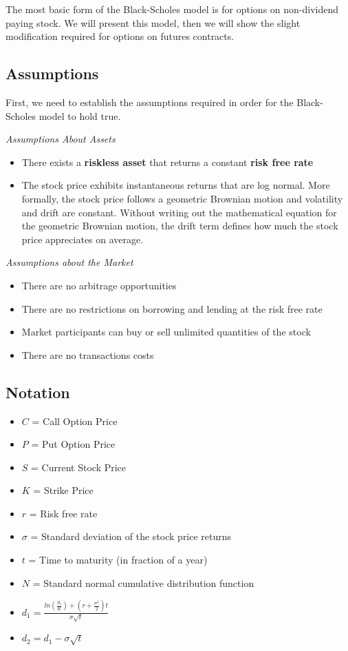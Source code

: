 \documentclass[
]{book}
\begin{document}
The most basic form of the Black-Scholes model is for options on non-dividend paying stock. We will present this model, then we will show the slight modification required for options on futures contracts.

\hypertarget{assumptions}{%
\subsection{Assumptions}\label{assumptions}}

First, we need to establish the assumptions required in order for the Black-Scholes model to hold true. \citep{blacksc2020}

\emph{Assumptions About Assets}

\begin{itemize}
\item
  There exists a \textbf{riskless asset} that returns a constant \textbf{risk free rate}
\item
  The stock price exhibits instantaneous returns that are log normal. More formally, the stock price follows a geometric Brownian motion and volatility and drift are constant. Without writing out the mathematical equation for the geometric Brownian motion, the drift term defines how much the stock price appreciates on average.
\end{itemize}

\emph{Assumptions about the Market}

\begin{itemize}
\item
  There are no arbitrage opportunities
\item
  There are no restrictions on borrowing and lending at the risk free rate
\item
  Market participants can buy or sell unlimited quantities of the stock
\item
  There are no transactions costs
\end{itemize}

\hypertarget{notation}{%
\subsection{Notation}\label{notation}}

\begin{itemize}
\item
  \(C\) = Call Option Price
\item
  \(P\) = Put Option Price
\item
  \(S\) = Current Stock Price
\item
  \(K\) = Strike Price
\item
  \(r\) = Risk free rate
\item
  \(\sigma\) = Standard deviation of the stock price returns
\item
  \(t\) = Time to maturity (in fraction of a year)
\item
  \(N\) = Standard normal cumulative distribution function
\item
  \(d_{1} = \frac{ln(\frac{S_{t}}{K}) + (r + \frac{\sigma^{2}}{2})t}{\sigma \sqrt{t}}\)
\item
  \(d_{2} = d_{1} - \sigma \sqrt{t}\)
\end{itemize}
\end{document}
